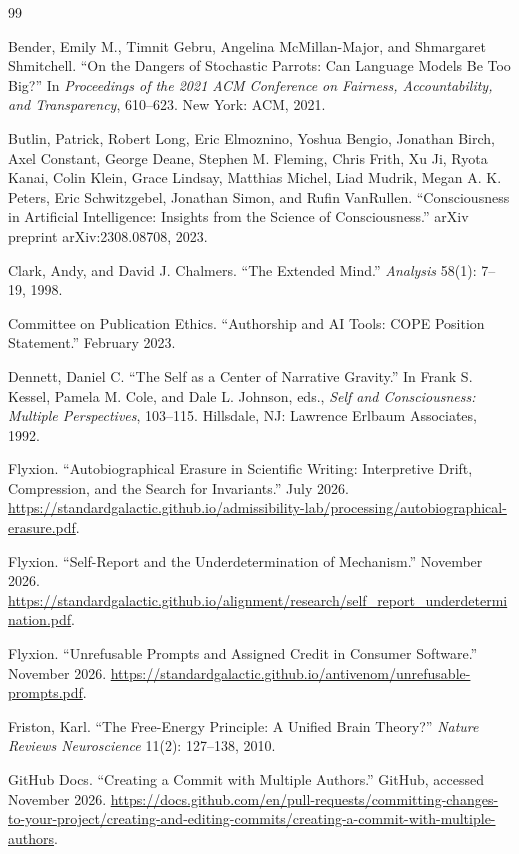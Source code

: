 \documentclass[12pt]{article}
\theoremstyle{definition}
\theoremstyle{plain}
\begin{document}
\begin{thebibliography}{99}

Bender, Emily M., Timnit Gebru, Angelina McMillan-Major, and Shmargaret Shmitchell. ``On the Dangers of Stochastic Parrots: Can Language Models Be Too Big?'' In \emph{Proceedings of the 2021 ACM Conference on Fairness, Accountability, and Transparency}, 610--623. New York: ACM, 2021.

Butlin, Patrick, Robert Long, Eric Elmoznino, Yoshua Bengio, Jonathan Birch, Axel Constant, George Deane, Stephen M. Fleming, Chris Frith, Xu Ji, Ryota Kanai, Colin Klein, Grace Lindsay, Matthias Michel, Liad Mudrik, Megan A. K. Peters, Eric Schwitzgebel, Jonathan Simon, and Rufin VanRullen. ``Consciousness in Artificial Intelligence: Insights from the Science of Consciousness.'' arXiv preprint arXiv:2308.08708, 2023.

Clark, Andy, and David J. Chalmers. ``The Extended Mind.'' \emph{Analysis} 58(1): 7--19, 1998.

Committee on Publication Ethics. ``Authorship and AI Tools: COPE Position Statement.'' February 2023.

Dennett, Daniel C. ``The Self as a Center of Narrative Gravity.'' In Frank S. Kessel, Pamela M. Cole, and Dale L. Johnson, eds., \emph{Self and Consciousness: Multiple Perspectives}, 103--115. Hillsdale, NJ: Lawrence Erlbaum Associates, 1992.

Flyxion. ``Autobiographical Erasure in Scientific Writing: Interpretive Drift, Compression, and the Search for Invariants.'' July 2026. \url{https://standardgalactic.github.io/admissibility-lab/processing/autobiographical-erasure.pdf}.

Flyxion. ``Self-Report and the Underdetermination of Mechanism.'' November 2026. \url{https://standardgalactic.github.io/alignment/research/self_report_underdetermination.pdf}.

Flyxion. ``Unrefusable Prompts and Assigned Credit in Consumer Software.'' November 2026. \url{https://standardgalactic.github.io/antivenom/unrefusable-prompts.pdf}.

Friston, Karl. ``The Free-Energy Principle: A Unified Brain Theory?'' \emph{Nature Reviews Neuroscience} 11(2): 127--138, 2010.

GitHub Docs. ``Creating a Commit with Multiple Authors.'' GitHub, accessed November 2026. \url{https://docs.github.com/en/pull-requests/committing-changes-to-your-project/creating-and-editing-commits/creating-a-commit-with-multiple-authors}.


\end{thebibliography}
\end{document}
